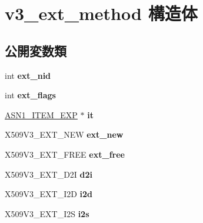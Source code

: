 \hypertarget{structv3__ext__method}{}\section{v3\+\_\+ext\+\_\+method 構造体}
\label{structv3__ext__method}
\subsection*{公開変数類}
\begin{DoxyCompactItemize}
\item 
\hypertarget{structv3__ext__method_ad9f39327ffdb8ffb8cfdbea5a3081600}{}int {\bfseries ext\+\_\+nid}\label{structv3__ext__method_ad9f39327ffdb8ffb8cfdbea5a3081600}

\item 
\hypertarget{structv3__ext__method_aa3e784b4aad755aa1c7d3b21b14d68d8}{}int {\bfseries ext\+\_\+flags}\label{structv3__ext__method_aa3e784b4aad755aa1c7d3b21b14d68d8}

\item 
\hypertarget{structv3__ext__method_a6f57d2623c9652447056936691e7325f}{}\hyperlink{struct_a_s_n1___i_t_e_m__st}{A\+S\+N1\+\_\+\+I\+T\+E\+M\+\_\+\+E\+X\+P} $\ast$ {\bfseries it}\label{structv3__ext__method_a6f57d2623c9652447056936691e7325f}

\item 
\hypertarget{structv3__ext__method_a91b49ad85108d38d4acad8a29562c433}{}X509\+V3\+\_\+\+E\+X\+T\+\_\+\+N\+E\+W {\bfseries ext\+\_\+new}\label{structv3__ext__method_a91b49ad85108d38d4acad8a29562c433}

\item 
\hypertarget{structv3__ext__method_ac5cc2cd14dacbf0cefad5daa6481ee53}{}X509\+V3\+\_\+\+E\+X\+T\+\_\+\+F\+R\+E\+E {\bfseries ext\+\_\+free}\label{structv3__ext__method_ac5cc2cd14dacbf0cefad5daa6481ee53}

\item 
\hypertarget{structv3__ext__method_affd83034cb2127f5c95827e92532d7da}{}X509\+V3\+\_\+\+E\+X\+T\+\_\+\+D2\+I {\bfseries d2i}\label{structv3__ext__method_affd83034cb2127f5c95827e92532d7da}

\item 
\hypertarget{structv3__ext__method_af61d993d88060b09737ed999339817f5}{}X509\+V3\+\_\+\+E\+X\+T\+\_\+\+I2\+D {\bfseries i2d}\label{structv3__ext__method_af61d993d88060b09737ed999339817f5}

\item 
\hypertarget{structv3__ext__method_ae6b9e63922dfd426a4bd8cda4c8719a5}{}X509\+V3\+\_\+\+E\+X\+T\+\_\+\+I2\+S {\bfseries i2s}\label{structv3__ext__method_ae6b9e63922dfd426a4bd8cda4c8719a5}


\end{DoxyCompactItemize}
